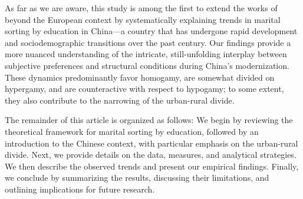 As far as we are aware, this study is among the first to extend the works of \textcite{leeschDecomposingTrendsEducational2023,leeschStructuralOpportunitiesAssortative2024} beyond the European context by systematically explaining trends in marital sorting by education in China—a country that has undergone rapid development and sociodemographic transitions over the past century. Our findings provide a more nuanced understanding of the intricate, still-unfolding interplay between subjective preferences and structural conditions during China's modernization. These dynamics predominantly favor homogamy, are somewhat divided on hypergamy, and are counteractive with respect to hypogamy; to some extent, they also contribute to the narrowing of the urban-rural divide.

The remainder of this article is organized as follows: We begin by reviewing the theoretical framework for marital sorting by education, followed by an introduction to the Chinese context, with particular emphasis on the urban-rural divide. Next, we provide details on the data, measures, and analytical strategies. We then describe the observed trends and present our empirical findings. Finally, we conclude by summarizing the results, discussing their limitations, and outlining implications for future research.
